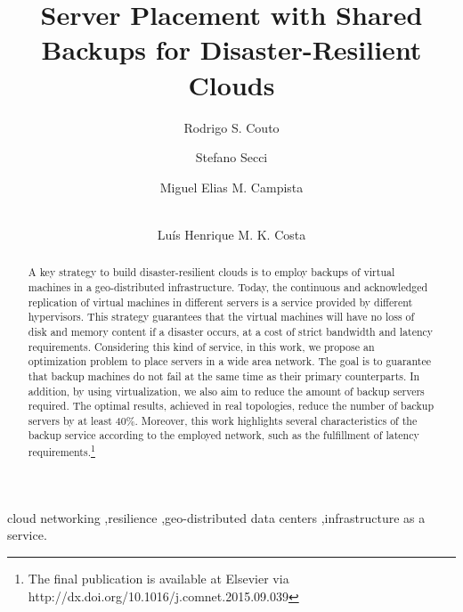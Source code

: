 \documentclass[preprint]{elsarticle}
\begin{document}
\begin{frontmatter}



\title{Server Placement with Shared Backups for Disaster-Resilient Clouds}

\author[ufrj,uerj]{Rodrigo S. Couto}
\author[upmc]{Stefano Secci}
\author[ufrj]{Miguel Elias M. Campista}
\author[ufrj]{\\ Lu\'is Henrique M. K. Costa}
\address[ufrj]{Universidade Federal do Rio de Janeiro - COPPE/PEE/GTA - POLI/DEL\\
	       P.O. Box 68504 - CEP 21941-972, Rio de Janeiro, RJ, Brazil\\
}
\address[uerj]{Universidade do Estado do Rio de Janeiro - FEN/DETEL/PEL\\
	       CEP 20550-013, Rio de Janeiro, RJ, Brazil\\
}
\address[upmc]{Sorbonne Universit\'es, UPMC Univ Paris 06, UMR 7606, LIP6 \\ 
		F-75005, Paris, France
}

\begin{abstract}
A key strategy to build disaster-resilient clouds is to employ backups of virtual machines in a geo-distributed infrastructure. Today, the continuous and acknowledged replication of virtual machines in different servers is a service provided by different hypervisors. This strategy guarantees that the virtual machines will have no loss of disk and memory content if a disaster occurs, at a cost of strict bandwidth and latency requirements. Considering this kind of service, in this work, we propose an optimization problem to place servers in a wide area network. The goal is to guarantee that backup machines do not fail at the same time as their primary counterparts. In addition, by using virtualization, we also aim to reduce the amount of backup servers required. The optimal results, achieved in real topologies, reduce the number of backup servers by at least 40\%. Moreover, this work highlights several characteristics of the backup service according to the employed network, such as the fulfillment of latency requirements.\footnote{The final publication is available at Elsevier via\\ http://dx.doi.org/10.1016/j.comnet.2015.09.039} 
\end{abstract}

\begin{keyword}
cloud networking \sep resilience \sep geo-distributed data centers \sep infrastructure as a service.

\end{keyword}

\end{frontmatter}
\end{document}
